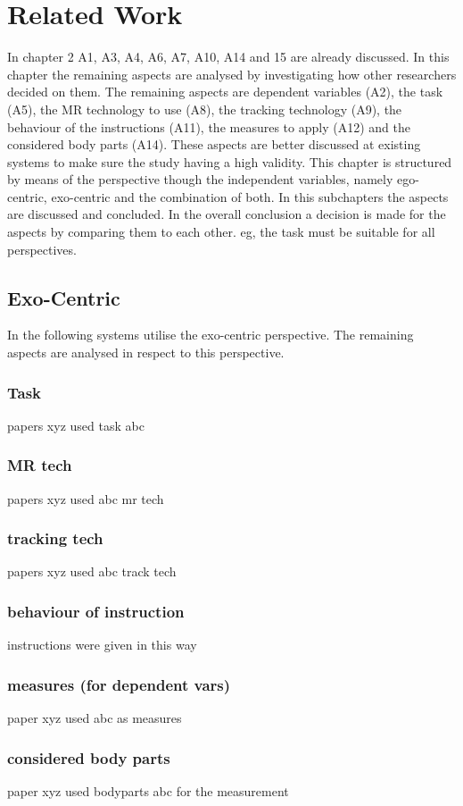 \chapter{Related Work}
In chapter 2 A1, A3, A4, A6, A7, A10, A14 and 15 are already discussed. In this chapter the remaining aspects are analysed by investigating how other researchers decided on them. The remaining aspects are dependent variables (A2), the task (A5), the MR technology to use (A8), the tracking technology (A9), the behaviour of the instructions (A11), the measures to apply (A12) and the considered body parts (A14). These aspects are better discussed at existing systems to make sure the study having a high validity. This chapter is structured by means of the perspective though the independent variables, namely ego-centric, exo-centric and the combination of both. In this subchapters the aspects are discussed and concluded. In the overall conclusion a decision is made for the aspects by comparing them to each other. eg, the task must be suitable for all perspectives.
\section{Exo-Centric}
In the following systems utilise the exo-centric perspective. The remaining aspects are analysed in respect to this perspective.
\subsection{Task}
papers xyz used task abc
\subsection{MR tech}
papers xyz used abc mr tech
\subsection{tracking tech}
papers xyz used abc track tech
\subsection{behaviour of instruction}
instructions were given in this way
\subsection{measures (for dependent vars)}
paper xyz used abc as measures
\subsection{considered body parts}
paper xyz used bodyparts abc for the measurement
